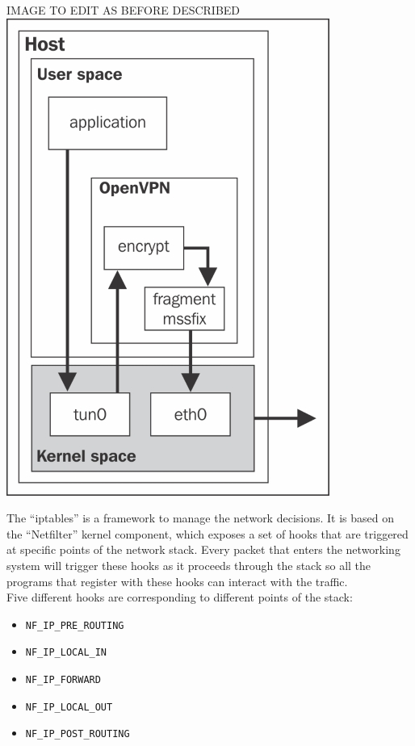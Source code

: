 \documentclass[]{article}
\begin{document}
	IMAGE TO EDIT AS BEFORE DESCRIBED
	\includegraphics{"images/openvpn_tun_interface.jpg"}

	The ``iptables'' is a framework to manage the network decisions. It is based on the ``Netfilter'' kernel component, which exposes a set of hooks that are triggered at specific points of the network stack. Every packet that enters the networking system will trigger these hooks as it proceeds through the stack so all the programs that register with these hooks can interact with the traffic.\\
	Five different hooks are corresponding to different points of the stack:\\

	\begin{itemize}
		\item \lstinline{NF_IP_PRE_ROUTING}
		\item \lstinline{NF_IP_LOCAL_IN}
		\item \lstinline{NF_IP_FORWARD}
		\item \lstinline{NF_IP_LOCAL_OUT}
		\item \lstinline{NF_IP_POST_ROUTING}
	\end{itemize}
	
\end{document}
